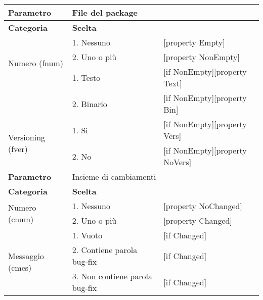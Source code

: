 \begin{tabular}{|p{4cm}|p{4cm}p{5cm}|}
	\hline
	\cellcolor{Gray} \textbf{Parametro}				& \multicolumn{2}{l|}{File del package}							\tabularnewline
	\hline
	\rowcolor{Gray}
	\textbf{Categoria}						& \textbf{Scelta}			&						\tabularnewline
	\hline
	\multirow{3}{*}{Numero (fnum)}					& 1. Nessuno				&	[property Empty] 			\tabularnewline
									\cline{2-3}
									& 2. Uno o più				&	[property NonEmpty]			\tabularnewline
	\hline
	\multirow{2}{*}{Tipo (ftype)}					& 1. Testo				&	[if NonEmpty][property Text] 		\tabularnewline
									\cline{2-3}
									& 2. Binario				&	[if NonEmpty][property Bin]		\tabularnewline
	\hline
	\multirow{2}{*}{Versioning (fver)}				& 1. Sì					&	[if NonEmpty][property Vers] 		\tabularnewline
									\cline{2-3}
									& 2. No					&	[if NonEmpty][property NoVers]		\tabularnewline
	\hline
	
	\cellcolor{Gray} \textbf{Parametro}				& \multicolumn{2}{l|}{Insieme di cambiamenti}						\tabularnewline
	\hline
	\rowcolor{Gray}
	\textbf{Categoria}						& \textbf{Scelta}			&						\tabularnewline
	\hline
	\multirow{2}{*}{Numero (cnum)}					& 1. Nessuno				&	[property NoChanged] 			\tabularnewline
									\cline{2-3}
									& 2. Uno o più				&	[property Changed]		\tabularnewline
	\multirow{3}{*}{Messaggio (cmes)} 				& 1. Vuoto 				&	[if Changed]		\tabularnewline
									\cline{2-3}
									& 2. Contiene parola bug-fix 		&	[if Changed]		\tabularnewline
									\cline{2-3}
									& 3. Non contiene parola bug-fix	&	[if Changed]		\tabularnewline
	
	\hline

	\hline
\end{tabular}

\vspace{1cm}

